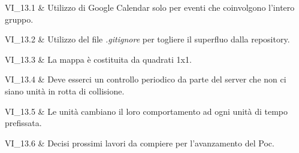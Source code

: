 VI\_13.1 & Utilizzo di Google Calendar solo per eventi che coinvolgono l'intero gruppo.

\tabularnewline 

VI\_13.2 & Utilizzo del file \textit{.gitignore} per togliere il superfluo dalla repository.

\tabularnewline 

VI\_13.3 & La mappa è costituita da quadrati 1x1.

\tabularnewline 
	
VI\_13.4 & Deve esserci un controllo periodico da parte del server che non ci siano unità in rotta di collisione.

\tabularnewline 
VI\_13.5 & Le unità cambiano il loro comportamento ad ogni unità di tempo prefissata.

\tabularnewline 
VI\_13.6 & Decisi prossimi lavori da compiere per l'avanzamento del Poc.

\tabularnewline 